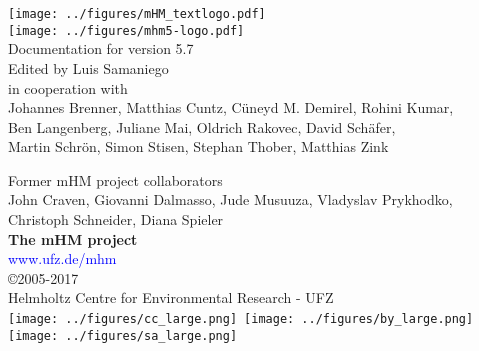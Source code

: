 \documentclass[twoside]{book}
\newcommand{\+}{\discretionary{\mbox{\scriptsize$\hookleftarrow$}}{}{}}
\newcommand{\clearemptydoublepage}{%
  \newpage{\pagestyle{empty}\cleardoublepage}%
}
\begin{document}

\hypersetup{pageanchor=false,
             bookmarks=true,
             bookmarksnumbered=true,
             pdfencoding=unicode
            }
\begin{titlepage}
\vspace*{1.5cm}
\begin{center}%
\texttt{[image: ../figures/mHM\_textlogo.pdf]}\\

\vspace*{1cm}
\texttt{[image: ../figures/mhm5-logo.pdf]}\\
\vspace*{1.5cm}
{\Large Documentation for version 5.7}\\
\vspace*{2.5cm}
{\large Edited by Luis Samaniego}\\
\vspace*{0.5cm}
{\large in cooperation with}\\
\vspace*{0.5cm}
{\large 
Johannes Brenner,
Matthias Cuntz,
C\"uneyd M. Demirel,
Rohini Kumar,\\[1ex]
Ben Langenberg, 
Juliane Mai, 
Oldrich Rakovec, 
David Sch\"{a}fer,\\[1.2ex]
Martin Schr\"{o}n,
Simon Stisen,
Stephan Thober,
Matthias Zink }\\
\vspace*{1.9cm}
\vspace*{0.75cm}
\end{center}
\end{titlepage}

\newpage

\vspace*{2cm}
\begin{center}%
{\large Former mHM project collaborators}\\
\vspace*{0.5cm}
{\large 
John Craven,
Giovanni Dalmasso,
Jude Musuuza,
Vladyslav Prykhodko,
Christoph Schneider,
Diana Spieler
}\\
\vspace*{15.5cm}
{\huge \textbf{The mHM project}}\\
\textcolor{blue}{www.ufz.de/mhm}\\
\vspace*{0.5cm}
{\large \copyright 2005-2017}\\
{\large Helmholtz Centre for Environmental Research - UFZ}\\
\vspace*{0.2cm}
\texttt{[image: ../figures/cc\_large.png]}\,%
\texttt{[image: ../figures/by\_large.png]}\,%
\texttt{[image: ../figures/sa\_large.png]}%
\vspace*{0.25cm}

\end{center}

\clearemptydoublepage
\tableofcontents
\clearemptydoublepage
{}
\hypersetup{pageanchor=true}
\end{document}
